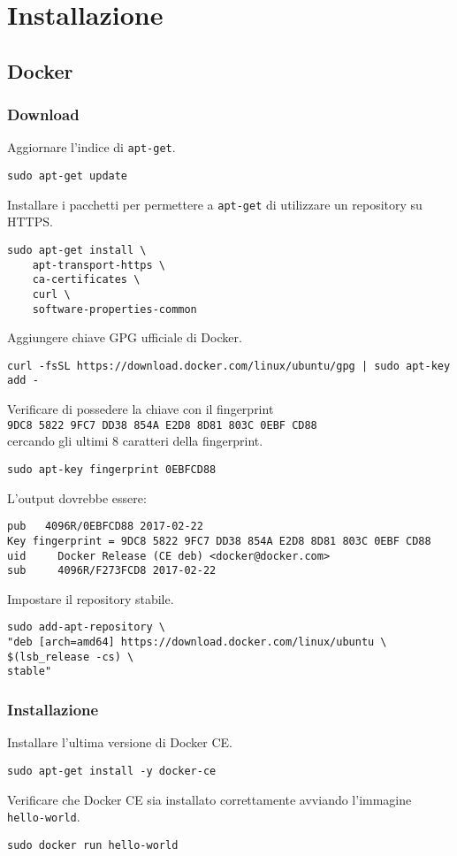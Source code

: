 \chapter{Installazione}
\label{Installazione}
\thispagestyle{empty}
\lstset{style=my-bash}

\section{Docker}

\subsection{Download}
Aggiornare l'indice di \verb|apt-get|.
\begin{lstlisting}
sudo apt-get update
\end{lstlisting}
Installare i pacchetti per permettere a \verb|apt-get| di utilizzare un repository su HTTPS.
\begin{lstlisting}
sudo apt-get install \ 
    apt-transport-https \
    ca-certificates \
    curl \
    software-properties-common
\end{lstlisting}
Aggiungere chiave GPG ufficiale di Docker.
\begin{lstlisting}
curl -fsSL https://download.docker.com/linux/ubuntu/gpg | sudo apt-key add -
\end{lstlisting}
Verificare di possedere la chiave con il fingerprint\\
\verb|9DC8 5822 9FC7 DD38 854A E2D8 8D81 803C 0EBF CD88|\\
cercando gli ultimi 8 caratteri della fingerprint.
\begin{lstlisting}
sudo apt-key fingerprint 0EBFCD88
\end{lstlisting}
L'output dovrebbe essere:
\begin{lstlisting}
pub   4096R/0EBFCD88 2017-02-22
Key fingerprint = 9DC8 5822 9FC7 DD38 854A E2D8 8D81 803C 0EBF CD88
uid     Docker Release (CE deb) <docker@docker.com>
sub     4096R/F273FCD8 2017-02-22
\end{lstlisting}
Impostare il repository stabile.
\begin{lstlisting}
sudo add-apt-repository \
"deb [arch=amd64] https://download.docker.com/linux/ubuntu \
$(lsb_release -cs) \
stable"
\end{lstlisting}

\subsection{Installazione}
Installare l'ultima versione di Docker CE.
\begin{lstlisting}
sudo apt-get install -y docker-ce
\end{lstlisting}
Verificare che Docker CE sia installato correttamente avviando l'immagine \verb|hello-world|.
\begin{lstlisting}
sudo docker run hello-world
\end{lstlisting}


